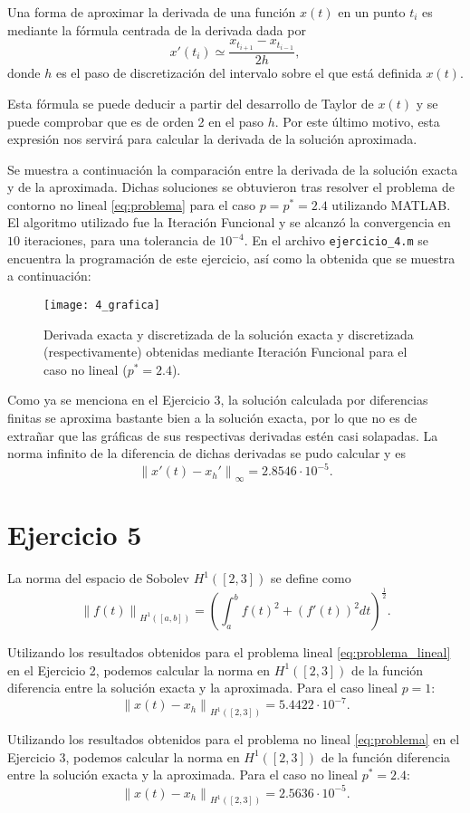 \documentclass[11pt]{article}
\newcommand{\norm}[1]{\left\lVert#1\right\rVert}
\begin{document}
Una forma de aproximar la derivada de una función $x(t)$ en un punto $t_i$ es mediante la fórmula centrada de la derivada dada por
\[
x'(t_i)\simeq \frac{x_{t_{i+1}}-x_{t_{i-1}}}{2h},
\]   
donde $h$ es el paso de discretización del intervalo sobre el que está definida $x(t)$. 

Esta fórmula se puede deducir a partir del desarrollo de Taylor de $x(t)$ y se puede comprobar que es de orden 2 en el paso $h$. Por este último motivo, esta expresión nos servirá para calcular la derivada de la solución aproximada.

Se muestra a continuación la comparación entre la derivada de la solución exacta y de la aproximada. Dichas soluciones se obtuvieron tras resolver el problema de contorno no lineal \eqref{eq:problema} para el caso $p=p^*=2.4$ utilizando MATLAB. El algoritmo utilizado fue la Iteración Funcional y se alcanzó la convergencia en $10$ iteraciones, para una tolerancia de $10^{-4}$. En el archivo \texttt{ejercicio\_4.m} se encuentra la programación de este ejercicio, así como la obtenida que se muestra a continuación:

\begin{figure}[H]
\centering
\texttt{[image: 4\_grafica]}
\caption{Derivada exacta y discretizada de la solución exacta y discretizada (respectivamente) obtenidas mediante Iteración Funcional para el caso no lineal ($p^*=2.4$).}
\label{fig:derivadas}
\end{figure}

Como ya se menciona en el Ejercicio 3, la solución calculada por diferencias finitas se aproxima bastante bien a la solución exacta, por lo que no es de extrañar que las gráficas de sus respectivas derivadas estén casi solapadas. La norma infinito de la diferencia de dichas derivadas se pudo calcular y es 
\[
\norm{x'(t)-x_h'}_{\infty}=2.8546\cdot 10^{-5}.
\] 


\section*{Ejercicio 5}

La norma del espacio de Sobolev $H^1([2,3])$ se define como
\[
\norm{f(t)}_{H^1([a,b])}=\left(\int_a^b f(t)^2 + (f'(t))^2 dt\right)^{\frac{1}{2}}.
\]

Utilizando los resultados obtenidos para el problema lineal \eqref{eq:problema_lineal} en el Ejercicio 2, podemos calcular la norma en $H^1([2,3])$ de la función diferencia entre la solución exacta y la aproximada. Para el caso lineal $p=1$: 
\[
\norm{x(t)-x_h}_{H^1([2,3])}=5.4422\cdot 10^{-7}.
\] 

Utilizando los resultados obtenidos para el problema no lineal \eqref{eq:problema} en el Ejercicio 3, podemos calcular la norma en $H^1([2,3])$ de la función diferencia entre la solución exacta y la aproximada. Para el caso no lineal $p^*=2.4$: 
\[
\norm{x(t)-x_h}_{H^1([2,3])}=2.5636\cdot 10^{-5}.
\] 
\end{document}
